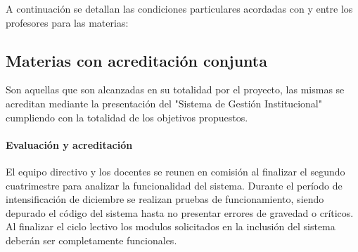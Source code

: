 A continuación se detallan las condiciones particulares acordadas con y entre los profesores para las materias:




\subsection{Materias con acreditación conjunta}

Son aquellas que son alcanzadas en su totalidad por el proyecto, las mismas se acreditan mediante la presentación del "Sistema de Gestión Institucional" cumpliendo con la totalidad de los objetivos propuestos.

\paragraph{Evaluación y acreditación} El equipo directivo y los docentes se reunen en comisión al finalizar el segundo cuatrimestre para analizar la funcionalidad del sistema. Durante el período de intensificación de diciembre se realizan pruebas de funcionamiento, siendo depurado el código del sistema hasta no presentar errores de gravedad o críticos. Al finalizar el ciclo lectivo los modulos solicitados en la inclusión del sistema deberán ser completamente funcionales.



